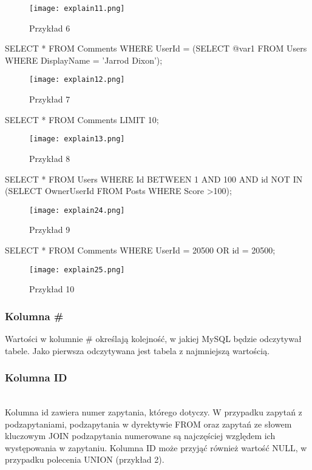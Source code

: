 \begin{figure}[H]
	\texttt{[image: explain11.png]} 
	\caption{Przykład 6}
\end{figure}
\begin{spverbatim}
	SELECT * FROM Comments WHERE UserId = (SELECT @var1 FROM Users WHERE DisplayName = 'Jarrod Dixon');
\end{spverbatim}
\begin{figure}[H]
	\texttt{[image: explain12.png]} 
	\caption{Przykład 7}
\end{figure}
\begin{spverbatim}
SELECT * FROM Comments LIMIT 10;
\end{spverbatim}
\begin{figure}[H]
	\texttt{[image: explain13.png]} 
	\caption{Przykład 8}
\end{figure}
\begin{spverbatim}
	SELECT * FROM Users WHERE Id BETWEEN 1 AND 100 AND 
	id NOT IN (SELECT OwnerUserId FROM Posts WHERE Score >100);
\end{spverbatim}
\begin{figure}[H]
	\texttt{[image: explain24.png]} 
	\caption{Przykład 9}
\end{figure}
\begin{spverbatim}
	SELECT * FROM Comments WHERE UserId = 20500 OR id = 20500;
\end{spverbatim}
\begin{figure}[H]
	\texttt{[image: explain25.png]} 
	\caption{Przykład 10}
\end{figure}

\subsubsection{Kolumna \#}
Wartości w kolumnie \# określają kolejność, w jakiej MySQL będzie odczytywał tabele. Jako pierwsza odczytywana jest tabela z najmniejszą wartością.

\subsubsection{Kolumna ID}\leavevmode\\
Kolumna id zawiera numer zapytania, którego dotyczy. W przypadku zapytań z podzapytaniami, podzapytania w dyrektywie FROM oraz zapytań ze słowem kluczowym JOIN podzapytania numerowane są najczęściej względem ich występowania w zapytaniu. Kolumna ID może przyjąć również wartość NULL, w przypadku polecenia UNION (przykład 2).

